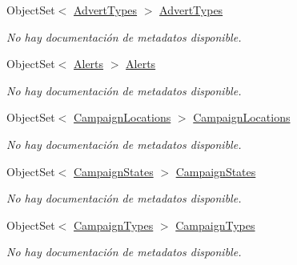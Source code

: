 \begin{DoxyCompactItemize}
Object\-Set$<$ \hyperlink{class_game_memory_1_1_advert_types}{Advert\-Types} $>$ \hyperlink{class_game_memory_1_1_o_m_k_t_d_b_entities_a39200deaba3b74b8048484063082f12c}{Advert\-Types}
\begin{DoxyCompactList}\small\item\em No hay documentación de metadatos disponible. \end{DoxyCompactList}\item 
Object\-Set$<$ \hyperlink{class_game_memory_1_1_alerts}{Alerts} $>$ \hyperlink{class_game_memory_1_1_o_m_k_t_d_b_entities_ad09c268d72a208931f255844067f0320}{Alerts}
\begin{DoxyCompactList}\small\item\em No hay documentación de metadatos disponible. \end{DoxyCompactList}\item 
Object\-Set$<$ \hyperlink{class_game_memory_1_1_campaign_locations}{Campaign\-Locations} $>$ \hyperlink{class_game_memory_1_1_o_m_k_t_d_b_entities_af34aeb2775d3c6ec3b02e8cca590efbf}{Campaign\-Locations}
\begin{DoxyCompactList}\small\item\em No hay documentación de metadatos disponible. \end{DoxyCompactList}\item 
Object\-Set$<$ \hyperlink{class_game_memory_1_1_campaign_states}{Campaign\-States} $>$ \hyperlink{class_game_memory_1_1_o_m_k_t_d_b_entities_a40eafcb06172d71454243edd172cabab}{Campaign\-States}
\begin{DoxyCompactList}\small\item\em No hay documentación de metadatos disponible. \end{DoxyCompactList}\item 
Object\-Set$<$ \hyperlink{class_game_memory_1_1_campaign_types}{Campaign\-Types} $>$ \hyperlink{class_game_memory_1_1_o_m_k_t_d_b_entities_a2ba2ce1961e801eff559deb4772485e7}{Campaign\-Types}
\begin{DoxyCompactList}\small\item\em No hay documentación de metadatos disponible. \end{DoxyCompactList}\item 

\end{DoxyCompactItemize}
